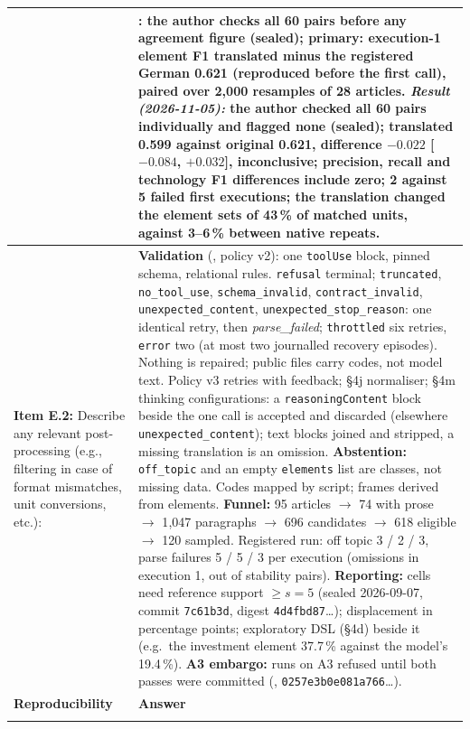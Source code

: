 \documentclass[12pt]{article}
\begin{document}
{\begin{longtable}{|J|K|}
\\[2pt]
& : the author checks all 60 pairs before any agreement figure (sealed); primary: execution-1 element F1 translated minus the registered German 0.621 (reproduced before the first call), paired over 2{,}000 resamples of 28 articles. \textit{Result (2026-11-05):} the author checked all 60 pairs individually and flagged none (sealed); translated 0.599 against original 0.621, difference $-0.022$ [$-0.084$, $+0.032$], inconclusive; precision, recall and technology F1 differences include zero; 2 against 5 failed first executions; the translation changed the element sets of 43\,\% of matched units, against 3--6\,\% between native repeats.
\\
\hline
\textbf{Item E.2:} Describe any relevant post-processing (e.g., filtering in case of format mismatches, unit conversions, etc.):
&
\textbf{Validation} (, policy v2): one \texttt{toolUse} block, pinned schema, relational rules. \texttt{refusal} terminal; \texttt{truncated}, \texttt{no\_tool\_use}, \texttt{schema\_invalid}, \texttt{contract\_invalid}, \texttt{unexpected\_content}, \texttt{unexpected\_stop\_reason}: one identical retry, then \emph{parse\_failed}; \texttt{throttled} six retries, \texttt{error} two (at most two journalled recovery episodes). Nothing is repaired; public files carry codes, not model text. Policy v3 retries with feedback; \S4j normaliser; \S4m thinking configurations: a \texttt{reasoningContent} block beside the one call is accepted and discarded (elsewhere \texttt{unexpected\_content});  text blocks joined and stripped, a missing translation is an omission. \textbf{Abstention:} \texttt{off\_topic} and an empty \texttt{elements} list are classes, not missing data. Codes mapped by script; frames derived from elements. \textbf{Funnel:} 95 articles $\to$ 74 with prose $\to$ 1{,}047 paragraphs $\to$ 696 candidates $\to$ 618 eligible $\to$ 120 sampled. Registered run: off topic 3 / 2 / 3, parse failures 5 / 5 / 3 per execution (omissions in execution 1, out of stability pairs). \textbf{Reporting:} cells need reference support $\geq s = 5$ (sealed 2026-09-07, commit \texttt{7c61b3d}, digest \texttt{4d4fbd87}\ldots); displacement in percentage points; exploratory DSL (\S4d) beside it (e.g.\ the investment element 37.7\,\% against the model's 19.4\,\%). \textbf{A3 embargo:} runs on A3 refused until both passes were committed (, \texttt{0257e3b0e081a766}\ldots).
\\
\hline
{}
\textbf{Reproducibility} & \textbf{Answer} \\*


\end{longtable}}
\end{document}
